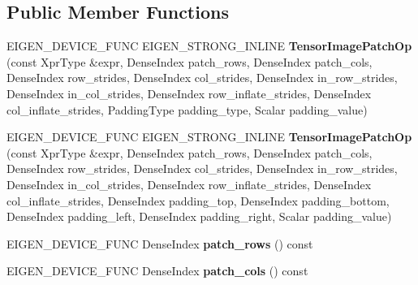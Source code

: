 \subsection*{Public Member Functions}
\begin{DoxyCompactItemize}
\item 
\mbox{\label{class_eigen_1_1_tensor_image_patch_op_a718858827fba7cadb563a76889a3c76d}} 
E\+I\+G\+E\+N\+\_\+\+D\+E\+V\+I\+C\+E\+\_\+\+F\+U\+NC E\+I\+G\+E\+N\+\_\+\+S\+T\+R\+O\+N\+G\+\_\+\+I\+N\+L\+I\+NE {\bfseries Tensor\+Image\+Patch\+Op} (const Xpr\+Type \&expr, Dense\+Index patch\+\_\+rows, Dense\+Index patch\+\_\+cols, Dense\+Index row\+\_\+strides, Dense\+Index col\+\_\+strides, Dense\+Index in\+\_\+row\+\_\+strides, Dense\+Index in\+\_\+col\+\_\+strides, Dense\+Index row\+\_\+inflate\+\_\+strides, Dense\+Index col\+\_\+inflate\+\_\+strides, Padding\+Type padding\+\_\+type, Scalar padding\+\_\+value)
\item 
\mbox{\label{class_eigen_1_1_tensor_image_patch_op_a34698ee6c72b81ae6d6f7aa7fc346c76}} 
E\+I\+G\+E\+N\+\_\+\+D\+E\+V\+I\+C\+E\+\_\+\+F\+U\+NC E\+I\+G\+E\+N\+\_\+\+S\+T\+R\+O\+N\+G\+\_\+\+I\+N\+L\+I\+NE {\bfseries Tensor\+Image\+Patch\+Op} (const Xpr\+Type \&expr, Dense\+Index patch\+\_\+rows, Dense\+Index patch\+\_\+cols, Dense\+Index row\+\_\+strides, Dense\+Index col\+\_\+strides, Dense\+Index in\+\_\+row\+\_\+strides, Dense\+Index in\+\_\+col\+\_\+strides, Dense\+Index row\+\_\+inflate\+\_\+strides, Dense\+Index col\+\_\+inflate\+\_\+strides, Dense\+Index padding\+\_\+top, Dense\+Index padding\+\_\+bottom, Dense\+Index padding\+\_\+left, Dense\+Index padding\+\_\+right, Scalar padding\+\_\+value)
\item 
\mbox{\label{class_eigen_1_1_tensor_image_patch_op_a1c91c64f0645c45a1ff9c3b4253fa1c2}} 
E\+I\+G\+E\+N\+\_\+\+D\+E\+V\+I\+C\+E\+\_\+\+F\+U\+NC Dense\+Index {\bfseries patch\+\_\+rows} () const
\item 
\mbox{\label{class_eigen_1_1_tensor_image_patch_op_a3a27f33569e00df968a5e4b36f51b57a}} 
E\+I\+G\+E\+N\+\_\+\+D\+E\+V\+I\+C\+E\+\_\+\+F\+U\+NC Dense\+Index {\bfseries patch\+\_\+cols} () const
\item 
\mbox{\label{class_eigen_1_1_tensor_image_patch_op_a802546a8dae43a44aa924bfc11e52eae}} 

\end{DoxyCompactItemize}
